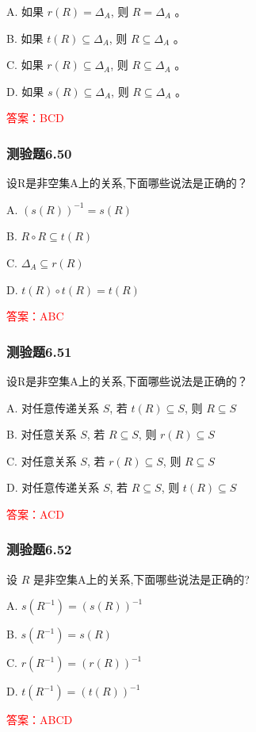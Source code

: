 \documentclass[UTF8, heading=true]{ctexart}
\begin{document}
A. 如果 $r(R)=\Delta_A$, 则 $R=\Delta_A$ 。

B. 如果 $t(R) \subseteq \Delta_A$, 则 $R \subseteq \Delta_A$ 。

C. 如果 $r(R) \subseteq \Delta_A$, 则 $R \subseteq \Delta_A$ 。

D. 如果 $s(R) \subseteq \Delta_A$, 则 $R \subseteq \Delta_A$ 。

\textcolor{red}{答案：BCD}

\subsubsection{测验题6.50}

设R是非空集A上的关系,下面哪些说法是正确的？

A. $(s(R))^{-1}=s(R)$

B. $R \circ R \subseteq t(R)$

C. $\Delta_A \subseteq r(R)$

D. $t(R) \circ t(R)=t(R)$

\textcolor{red}{答案：ABC}

\subsubsection{测验题6.51}

设R是非空集A上的关系,下面哪些说法是正确的？

A. 对任意传递关系 $S$, 若 $t(R) \subseteq S$, 则 $R \subseteq S$

B. 对任意关系 $S$, 若 $R \subseteq S$, 则 $r(R) \subseteq S$

C. 对任意关系 $S$, 若 $r(R) \subseteq S$, 则 $R \subseteq S$

D. 对任意传递关系 $S$, 若 $R \subseteq S$, 则 $t(R) \subseteq S$

\textcolor{red}{答案：ACD}

\subsubsection{测验题6.52}

设 $R$ 是非空集A上的关系,下面哪些说法是正确的?

A. $s\left(R^{-1}\right)=(s(R))^{-1}$

B. $s\left(R^{-1}\right)=s(R)$

C. $r\left(R^{-1}\right)=(r(R))^{-1}$

D. $t\left(R^{-1}\right)=(t(R))^{-1}$

\textcolor{red}{答案：ABCD}
\end{document}
